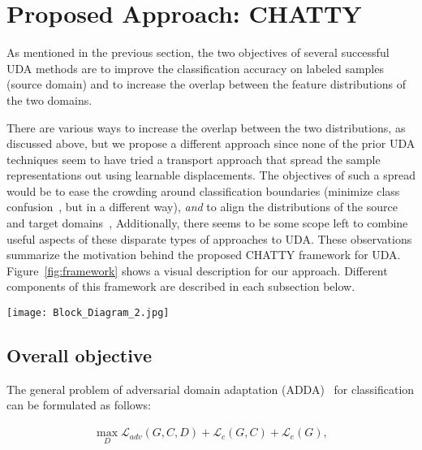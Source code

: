 \documentclass[10pt,twocolumn,letterpaper]{article}
\begin{document}
\section{Proposed Approach: CHATTY}

As mentioned in the previous section, the two objectives of several successful UDA methods are to improve the classification accuracy on labeled samples (source domain) and to increase the overlap between the feature distributions of the two domains. 

There are various ways to increase the overlap between the two distributions, as discussed above, but we propose a different approach since none of the prior UDA techniques seem to have tried a transport approach that spread the sample representations out using learnable displacements. The objectives of such a spread would be to ease the crowding around classification boundaries (minimize class confusion~\cite{mcc}, but in a different way), \emph{and} to align the distributions of the source and target domains~\cite{mmd,homm,deepcoral,dcan,cdan,srdc}, Additionally, there seems to be some scope left to combine useful aspects of these disparate types of approaches to UDA. These observations summarize the motivation behind the proposed CHATTY framework for UDA. Figure~\ref{fig:framework} shows a visual description for our approach. Different components of this framework are described in each subsection below.


\begin{figure*}
\begin{center}
   \texttt{[image: Block\_Diagram\_2.jpg]}
\end{center}
   \caption{The proposed CHATTY framework, which is shared by the source and the target domain uses Transport Layers $\mathbf{T_1}$ and $\mathbf{T_2}$ compute the transport vectors that move classifier outputs to their final locations.}
\label{fig:framework}
\end{figure*}


\subsection{Overall objective}

The general problem of adversarial domain adaptation (ADDA)~\cite{adda} for classification can be formulated as follows:

\begin{equation}
\begin{aligned}
    \max_D \mathcal{L}_{adv}(G, C, D) + \mathcal{L}_c(G,C) + \mathcal{L}_e(G),
\end{aligned}
\end{equation}
\end{document}
